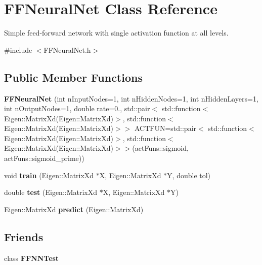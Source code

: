 \hypertarget{class_f_f_neural_net}{}\section{F\+F\+Neural\+Net Class Reference}
\label{class_f_f_neural_net}


Simple feed-\/forward network with single activation function at all levels.  




{\ttfamily \#include $<$F\+F\+Neural\+Net.\+h$>$}

\subsection*{Public Member Functions}
\begin{DoxyCompactItemize}
\item 
\mbox{\label{class_f_f_neural_net_a51b79470c6d19c7b7d37f043c695b5b0}} 
{\bfseries F\+F\+Neural\+Net} (int n\+Input\+Nodes=1, int n\+Hidden\+Nodes=1, int n\+Hidden\+Layers=1, int n\+Output\+Nodes=1, double rate=0., std\+::pair$<$ std\+::function$<$ Eigen\+::\+Matrix\+Xd(Eigen\+::\+Matrix\+Xd)$>$, std\+::function$<$ Eigen\+::\+Matrix\+Xd(Eigen\+::\+Matrix\+Xd)$>$$>$ A\+C\+T\+F\+UN=std\+::pair$<$ std\+::function$<$ Eigen\+::\+Matrix\+Xd(Eigen\+::\+Matrix\+Xd)$>$, std\+::function$<$ Eigen\+::\+Matrix\+Xd(Eigen\+::\+Matrix\+Xd)$>$$>$(act\+Funs\+::sigmoid, act\+Funs\+::sigmoid\+\_\+prime))
\item 
\mbox{\label{class_f_f_neural_net_ac419314557a65bebfa9d457673cc2211}} 
void {\bfseries train} (Eigen\+::\+Matrix\+Xd $\ast$X, Eigen\+::\+Matrix\+Xd $\ast$Y, double tol)
\item 
\mbox{\label{class_f_f_neural_net_ab8d26640e55c0422527822124c4216b7}} 
double {\bfseries test} (Eigen\+::\+Matrix\+Xd $\ast$X, Eigen\+::\+Matrix\+Xd $\ast$Y)
\item 
\mbox{\label{class_f_f_neural_net_ad42d220ba8a00ede1f60f6674eecc69a}} 
Eigen\+::\+Matrix\+Xd {\bfseries predict} (Eigen\+::\+Matrix\+Xd)
\end{DoxyCompactItemize}
\subsection*{Friends}
\begin{DoxyCompactItemize}
\item 
\mbox{\label{class_f_f_neural_net_a63fe7da00177d41882169c5f904d5652}} 
class {\bfseries F\+F\+N\+N\+Test}
\end{DoxyCompactItemize}


